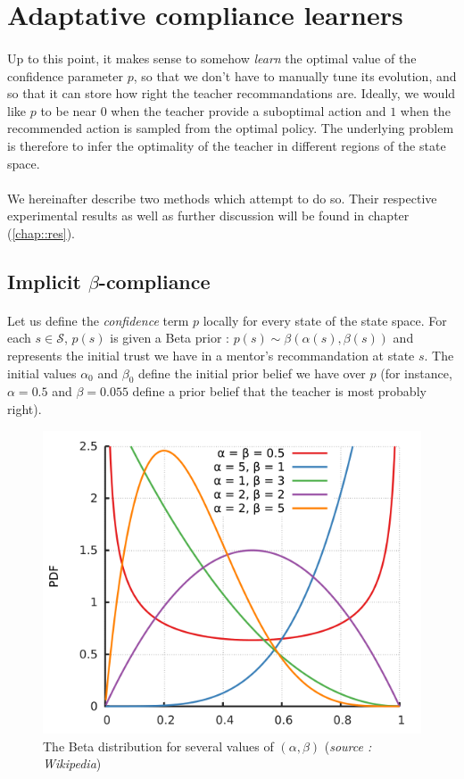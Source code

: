 \documentclass[a4paper]{report}
\begin{document}
{{	\section{Adaptative compliance learners}
	{	
		\label{section::adaptative_learners}
		\paragraph{} Up to this point, it makes sense to somehow \emph{learn} the optimal value of the confidence parameter $p$, so that we don't have to manually tune its evolution, and so that it can store how right the teacher recommandations are. Ideally, we would like $p$ to be near $0$ when the teacher provide a suboptimal action and $1$ when the recommended action is sampled from the optimal policy. The underlying problem is therefore to infer the optimality of the teacher in different regions of the state space. 
		
		\paragraph{}We hereinafter describe two methods which attempt to do so. Their respective experimental results as well as further discussion will be found in chapter (\ref{chap::res}).  
		
		\subsection{Implicit $\beta$-compliance}
		{
			\paragraph{}  Let us define the \emph{confidence} term $p$ locally for every state of the state space. For each $s\in\mathcal{S}$, $p(s)$ is given a Beta prior : $p(s)\sim \beta(\alpha(s),\beta(s))$ and represents the initial trust we have in a mentor's recommandation at state $s$. The initial values $\alpha_0$ and $\beta_0$ define the initial prior belief we have over $p$ (for instance, $\alpha=0.5$ and $\beta = 0.055$ define a prior belief that the teacher is most probably right). 
			
			\begin{figure}
				\begin{center}
					\includegraphics[width=0.5\linewidth]{Beta_distribution_pdf.png}
					\caption{The Beta distribution for several values of $(\alpha,\beta)$ (\emph{source : Wikipedia})}
				\end{center}
			\end{figure}
			
}}}}
\end{document}
